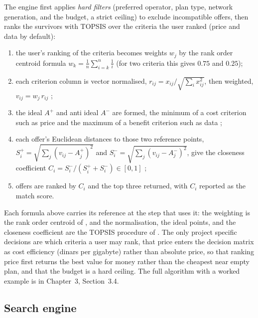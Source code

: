 The engine first applies \emph{hard filters} (preferred operator, plan type, network generation, and the budget, a strict ceiling) to exclude incompatible offers, then ranks the survivors with TOPSIS over the criteria the user ranked (price and data by default):
\begin{enumerate}
  \item the user's ranking of the criteria becomes weights $w_j$ by the rank order centroid formula $w_k = \tfrac{1}{n}\sum_{i=k}^{n} \tfrac{1}{i}$ \parencite{BarronBarrett1996} (for two criteria this gives $0.75$ and $0.25$);
  \item each criterion column is vector normalised, $r_{ij} = x_{ij}/\sqrt{\sum_i x_{ij}^2}$, then weighted, $v_{ij} = w_j\, r_{ij}$ \parencite{HwangYoon1981};
  \item the ideal $A^{+}$ and anti ideal $A^{-}$ are formed, the minimum of a cost criterion such as price and the maximum of a benefit criterion such as data \parencite{HwangYoon1981};
  \item each offer's Euclidean distances to those two reference points, $S_i^{+} = \sqrt{\sum_j (v_{ij}-A^{+}_j)^2}$ and $S_i^{-} = \sqrt{\sum_j (v_{ij}-A^{-}_j)^2}$, give the closeness coefficient $C_i = S_i^{-}/(S_i^{+}+S_i^{-}) \in [0,1]$ \parencite{HwangYoon1981};
  \item offers are ranked by $C_i$ and the top three returned, with $C_i$ reported as the match score.
\end{enumerate}
Each formula above carries its reference at the step that uses it: the weighting is the rank order centroid of \textcite{BarronBarrett1996}, and the normalisation, the ideal points, and the closeness coefficient are the TOPSIS procedure of \textcite{HwangYoon1981}. The only project specific decisions are which criteria a user may rank, that price enters the decision matrix as cost efficiency (dinars per gigabyte) rather than absolute price, so that ranking price first returns the best value for money rather than the cheapest near empty plan, and that the budget is a hard ceiling. The full algorithm with a worked example is in Chapter~3, Section~3.4.

\subsection{Search engine}

